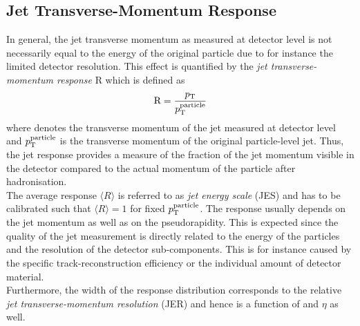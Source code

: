 \subsection{Jet Transverse-Momentum Response}
\label{subsec:jets_response}
In general, the jet transverse momentum as measured at detector level is not necessarily equal to the energy of the original particle due to for instance the limited detector resolution. This effect is quantified by the \textit{jet transverse-momentum response} R which is defined as 
\begin{equation}
  \mathrm{R} = \frac{p_{\text{T}}}{p_{\text{T}}^{\mathrm{particle}}} 
  \label{eq:response}
 \end{equation}
where \pt denotes the transverse momentum of the jet measured at detector level and $p_{\text{T}}^{\rm{particle}}$ is the transverse momentum of the original particle-level jet. Thus, the jet response provides a measure of the fraction of the jet momentum visible in the detector compared to the actual momentum of the particle after hadronisation. \\
The average response $\langle R \rangle$ is referred to as \textit{jet energy scale} (JES) and has to be calibrated such that $\langle R \rangle = 1$ for fixed $p_{\text{T}}^{\mathrm{particle}}$. The response usually depends on the jet momentum as well as on the pseudorapidity. This is expected since the quality of the jet measurement is directly related to the energy of the particles and the resolution of the detector sub-components. This is for instance caused by the specific track-reconstruction efficiency or the individual amount of detector material. \\
Furthermore, the width of the response distribution corresponds to the relative \textit{jet transverse-momentum resolution} (JER) and hence is a function of \pt and $\eta$ as well. 

